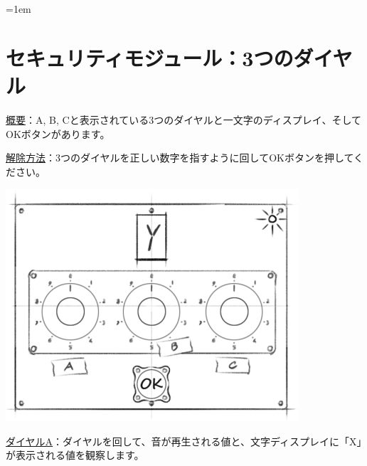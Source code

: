 \begin{minipage}{0.63\textwidth}
    \parskip=1em
    \section*{セキュリティモジュール：3つのダイヤル}
    
    \uline{概要}：A, B, Cと表示されている3つのダイヤルと一文字のディスプレイ、そしてOKボタンがあります。

    \uline{解除方法}：3つのダイヤルを正しい数字を指すように回してOKボタンを押してください。
\end{minipage}%
\hfill%
\begin{minipage}{0.33\textwidth}
    \includegraphics[width=\textwidth]{images/64.png}
    \vspace*{\fill}
\end{minipage}

\uline{ダイヤルA}：ダイヤルを回して、音が再生される値と、文字ディスプレイに「{X}」が表示される値を観察します。


